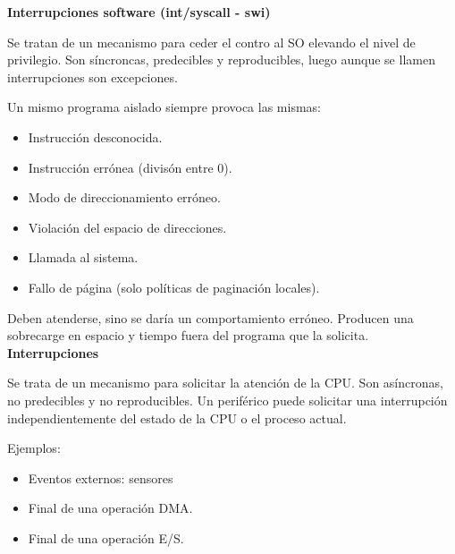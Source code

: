 \documentclass{article}
\begin{document}
\textbf{Interrupciones software (int/syscall - swi)}

Se tratan de un mecanismo para ceder el contro al SO elevando el nivel de privilegio. Son síncroncas, predecibles y reproducibles, luego aunque se llamen interrupciones son excepciones. 

Un mismo programa aislado siempre provoca las mismas:
\begin{itemize}
\item Instrucción desconocida.
\item Instrucción errónea (divisón entre 0).
\item Modo de direccionamiento erróneo.
\item Violación del espacio de direcciones.
\item Llamada al sistema.
\item Fallo de página (solo políticas de paginación locales).
\end{itemize}

Deben atenderse, sino se daría un comportamiento erróneo. Producen una sobrecarge en espacio y tiempo fuera del programa que la solicita.\\

\textbf{Interrupciones}

Se trata de un mecanismo para solicitar la atención de la CPU. Son asíncronas, no predecibles y no reproducibles. Un periférico puede solicitar una interrupción independientemente del estado de la CPU o el proceso actual.

Ejemplos:
	\begin{itemize}
	\item Eventos externos: sensores
	\item Final de una operación DMA.
	\item Final de una operación E/S.
	\end{itemize}
\end{document}
